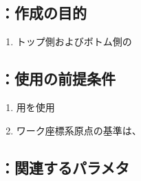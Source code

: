\clearrightpage


\subsection{\KOutcutRLeft：作成の目的}
\begin{enumerate}[label*=\sarrow]
\item トップ側およびボトム側の\OutcutMilling
\end{enumerate}


\subsection{\KOutcutRLeft：使用の前提条件}
\begin{enumerate}[label*=\sarrow]
\item \OutcutMilling 用\SquareEndMill を使用
\item {}ワーク座標系原点の基準は、\OutcutCenter
\end{enumerate}


\subsection{\KOutcutRLeft：関連するパラメタ}

